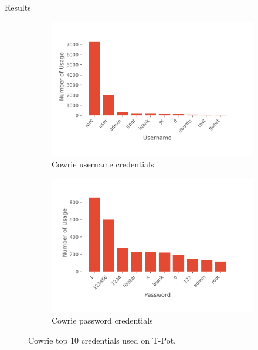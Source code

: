 \begin{frame}{Results}
    \begin{figure}
        \centering
        \begin{subfigure}[b]{0.49\columnwidth}
            \centering
            \includegraphics[width=\columnwidth]{img/tpot-cowrie-username.pdf}
            \caption{Cowrie username credentials}
            \label{fig:tpot-cowrie-username}
        \end{subfigure}
        \hfill
        \begin{subfigure}[b]{0.49\columnwidth}
            \centering
            \includegraphics[width=\columnwidth]{img/tpot-cowrie-password.pdf}
            \caption{Cowrie password credentials}
            \label{fig:tpot-cowrie-password}
        \end{subfigure}
        \caption[Cowrie top 10 credentials on T-Pot]{
            Cowrie top 10 credentials used on T-Pot.
        }
        \label{fig:cowrie-credentials}
    \end{figure}
\end{frame}

